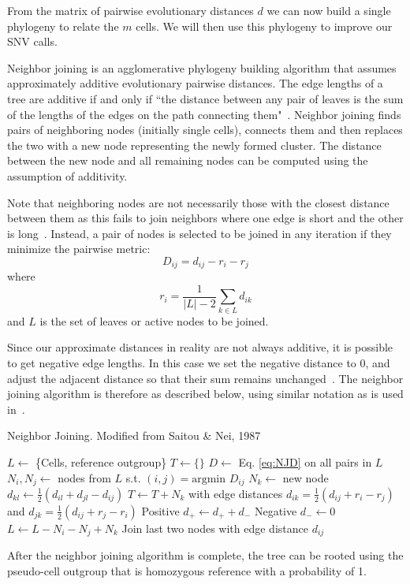 \documentclass[../../main.tex]{subfiles}
\begin{document}
From the matrix of pairwise evolutionary distances $d$ we can now build a single phylogeny to relate the $m$ cells.
We will then use this phylogeny to improve our SNV calls.

Neighbor joining is an agglomerative phylogeny building algorithm that assumes approximately additive evolutionary pairwise distances.
The edge lengths of a tree are additive if and only if ``the distance between any pair of leaves is the sum of the lengths of the edges on the path connecting them"~\cite{BSA}.
Neighbor joining finds pairs of neighboring nodes (initially single cells), connects them and then replaces the two with a new node representing the newly formed cluster.
The distance between the new node and all remaining nodes can be computed using the assumption of additivity.

Note that neighboring nodes are not necessarily those with the closest distance between them as this fails to join neighbors where one edge is short and the other is long~\cite{NJ, BSA}.
Instead, a pair of nodes is selected to be joined in any iteration if they minimize the pairwise metric:
\begin{equation}\label{eq:NJD}
    D_{ij} = d_{ij} - r_i - r_j
\end{equation}
where
\begin{equation*}
    r_i = \frac{1}{|L|-2}\sum_{k\in L}d_{ik}
\end{equation*}
and $L$ is the set of leaves or active nodes to be joined.

Since our approximate distances in reality are not always additive, it is possible to get negative edge lengths.
In this case we set the negative distance to 0, and adjust the adjacent distance so that their sum remains unchanged~\cite{negedge}.
The neighbor joining algorithm is therefore as described below, using similar notation as is used in~\cite{BSA}.

\begin{algorithm}
    \caption{Neighbor Joining. Modified from Saitou \& Nei, 1987}
    \begin{algorithmic}[5]
        \State $L\gets$ \{Cells, reference outgroup\}
        \State $T\gets\{\}$
            \State $D\gets$ Eq. \eqref{eq:NJD} on all pairs in $L$
            \State $N_i,N_j\gets$ nodes from $L$ s.t. $(i,j) = \text{argmin } D_{ij}$
            \State $N_k \gets$ new node
                \State $d_{kl} \gets \frac{1}{2}\left(d_{il} + d_{jl} - d_{ij}\right)$
            \EndFor
            \State $T \gets T + N_k$ with edge distances $d_{ik} = \frac{1}{2}\left(d_{ij}+r_i-r_j\right)$ and $d_{jk} = \frac{1}{2}\left(d_{ij}+r_j-r_i\right)$
                \State Positive $d_+\gets d_+ + d_-$ 
                \State Negative $d_-\gets 0$ 
            \EndIf
            \State $L \gets L -N_i -N_j + N_k$
        \EndWhile
        \State Join last two nodes with edge distance $d_{ij}$
    \end{algorithmic}
\end{algorithm}

After the neighbor joining algorithm is complete, the tree can be rooted using the pseudo-cell outgroup that is homozygous reference with a probability of 1.
\end{document}
